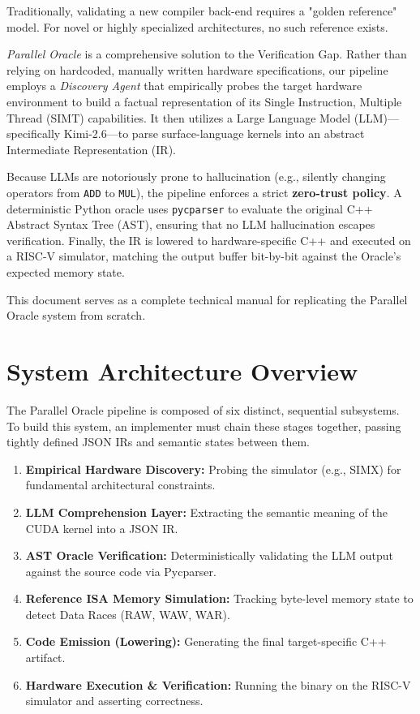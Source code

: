 \documentclass[10pt, conference, compsocconf]{IEEEtran}
\begin{document}
Traditionally, validating a new compiler back-end requires a "golden reference" model. For novel or highly specialized architectures, no such reference exists. 

\textit{Parallel Oracle} is a comprehensive solution to the Verification Gap. Rather than relying on hardcoded, manually written hardware specifications, our pipeline employs a \textit{Discovery Agent} that empirically probes the target hardware environment to build a factual representation of its Single Instruction, Multiple Thread (SIMT) capabilities. It then utilizes a Large Language Model (LLM)—specifically Kimi-2.6—to parse surface-language kernels into an abstract Intermediate Representation (IR). 

Because LLMs are notoriously prone to hallucination (e.g., silently changing operators from \texttt{ADD} to \texttt{MUL}), the pipeline enforces a strict \textbf{zero-trust policy}. A deterministic Python oracle uses \texttt{pycparser} to evaluate the original C++ Abstract Syntax Tree (AST), ensuring that no LLM hallucination escapes verification. Finally, the IR is lowered to hardware-specific C++ and executed on a RISC-V simulator, matching the output buffer bit-by-bit against the Oracle's expected memory state.

This document serves as a complete technical manual for replicating the Parallel Oracle system from scratch.

\section{System Architecture Overview}
The Parallel Oracle pipeline is composed of six distinct, sequential subsystems. To build this system, an implementer must chain these stages together, passing tightly defined JSON IRs and semantic states between them.

\begin{enumerate}
    \item \textbf{Empirical Hardware Discovery:} Probing the simulator (e.g., SIMX) for fundamental architectural constraints.
    \item \textbf{LLM Comprehension Layer:} Extracting the semantic meaning of the CUDA kernel into a JSON IR.
    \item \textbf{AST Oracle Verification:} Deterministically validating the LLM output against the source code via Pycparser.
    \item \textbf{Reference ISA Memory Simulation:} Tracking byte-level memory state to detect Data Races (RAW, WAW, WAR).
    \item \textbf{Code Emission (Lowering):} Generating the final target-specific C++ artifact.
    \item \textbf{Hardware Execution \& Verification:} Running the binary on the RISC-V simulator and asserting correctness.
\end{enumerate}
\end{document}
